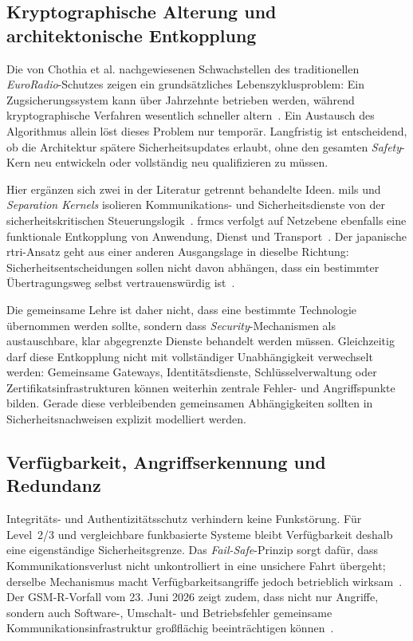 \documentclass[runningheads]{res/llncs}
\begin{document}
\subsection{Kryptographische Alterung und architektonische Entkopplung}
\label{sec:Kryptographische_Schwachstellen_und_MILS-basierte_Architekturkapselung}
Die von Chothia et al. nachgewiesenen Schwachstellen des traditionellen \textit{EuroRadio}-Schutzes zeigen ein grundsätzliches Lebenszyklusproblem: Ein Zugsicherungssystem kann über Jahrzehnte betrieben werden, während kryptographische Verfahren wesentlich schneller altern~\parencite[S. 751--754]{chothiaAttack2017}. Ein Austausch des Algorithmus allein löst dieses Problem nur temporär. Langfristig ist entscheidend, ob die Architektur spätere Sicherheitsupdates erlaubt, ohne den gesamten \textit{Safety}-Kern neu entwickeln oder vollständig neu qualifizieren zu müssen.

Hier ergänzen sich zwei in der Literatur getrennt behandelte Ideen. \gls{mils} und \textit{Separation Kernels} isolieren Kommunikations- und Sicherheitsdienste von der sicherheitskritischen Steuerungslogik~\parencite[S. 31--35]{schulzIntegration2019}. \gls{frmcs} verfolgt auf Netzebene ebenfalls eine funktionale Entkopplung von Anwendung, Dienst und Transport~\parencite[S. 123, 211]{trinckaufETCS2024}. Der japanische \gls{rtri}-Ansatz geht aus einer anderen Ausgangslage in dieselbe Richtung: Sicherheitsentscheidungen sollen nicht davon abhängen, dass ein bestimmter Übertragungsweg selbst vertrauenswürdig ist~\parencite[S. 1--4]{iwamotoTrain2024}.

Die gemeinsame Lehre ist daher nicht, dass eine bestimmte Technologie übernommen werden sollte, sondern dass \textit{Security}-Mechanismen als austauschbare, klar abgegrenzte Dienste behandelt werden müssen. Gleichzeitig darf diese Entkopplung nicht mit vollständiger Unabhängigkeit verwechselt werden: Gemeinsame Gateways, Identitätsdienste, Schlüsselverwaltung oder Zertifikatsinfrastrukturen können weiterhin zentrale Fehler- und Angriffspunkte bilden. Gerade diese verbleibenden gemeinsamen Abhängigkeiten sollten in Sicherheitsnachweisen explizit modelliert werden.

\subsection{Verfügbarkeit, Angriffserkennung und Redundanz}
\label{sec:IDS_MTD_und_Redundanzkonzepte}
Integritäts- und Authentizitätsschutz verhindern keine Funkstörung. Für Level~2/3 und vergleichbare funkbasierte Systeme bleibt Verfügbarkeit deshalb eine eigenständige Sicherheitsgrenze. Das \textit{Fail-Safe}-Prinzip sorgt dafür, dass Kommunikationsverlust nicht unkontrolliert in eine unsichere Fahrt übergeht; derselbe Mechanismus macht Verfügbarkeitsangriffe jedoch betrieblich wirksam~\parencite[S. 56--59]{gaggeroSurvey2024}. Der GSM-R-Vorfall vom 23. Juni 2026 zeigt zudem, dass nicht nur Angriffe, sondern auch Software-, Umschalt- und Betriebsfehler gemeinsame Kommunikationsinfrastruktur großflächig beeinträchtigen können~\cite{dbinfragoUrsacheZugfunkStoerung2026}.
\end{document}

